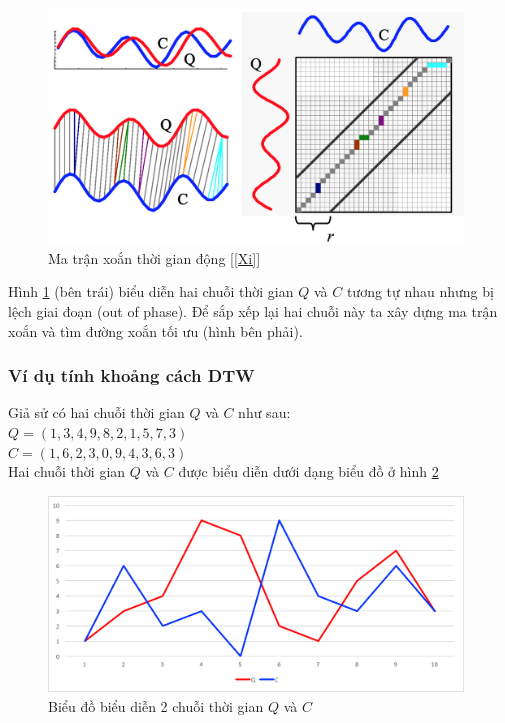 \documentclass[13pt,oneside]{scrbook}
\begin{document}
\begin{figure}[h!]
	\begin{center}
		\includegraphics[width=110mm]{DTW.png}
		\caption{Ma trận xoắn thời gian động [\ref{Xi}] }
		\label{DTW.png}
	\end{center}
\end{figure}
Hình \ref{DTW.png} (bên trái) biểu diễn hai chuỗi thời gian $Q$ và $C$ tương tự nhau nhưng bị lệch giai đoạn (out of phase). Để sắp xếp lại hai chuỗi này ta xây dựng ma trận xoắn và tìm đường xoắn tối ưu (hình bên phải).
\subsubsection{Ví dụ tính khoảng cách DTW}
Giả sử có hai chuỗi thời gian $Q$ và $C$ như sau: \\
$Q=(1,3,4,9,8,2,1,5,7,3)$\\
$C=(1,6,2,3,0,9,4,3,6,3)$\\
Hai chuỗi thời gian $Q$ và $C$ được biểu diễn dưới dạng biểu đồ ở hình \ref{DTW_Example_Graph.png}
\begin{figure}[H]
	\begin{center}
		\includegraphics[width=110mm]{DTW_Example_Graph.png}
		\caption{Biểu đồ biểu diễn 2 chuỗi thời gian $Q$ và $C$}
		\label{DTW_Example_Graph.png}
	\end{center}
\end{figure}
\end{document}
